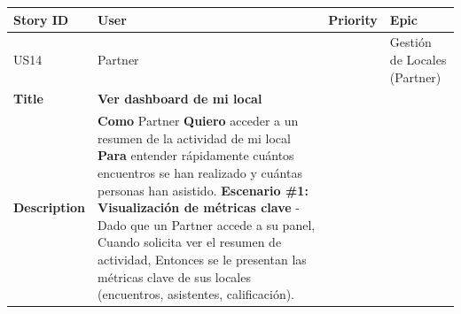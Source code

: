 {\def\LTcaptype{none} %
\begin{longtable}[]{@{}
  >{\raggedright\arraybackslash}p{}
  >{\raggedright\arraybackslash}p{}
  >{\raggedright\arraybackslash}p{}
  >{\raggedright\arraybackslash}p{}@{}}
\toprule\noalign{}
\begin{minipage}[b]{\linewidth}\raggedright
Story ID
\end{minipage} & \begin{minipage}[b]{\linewidth}\raggedright
User
\end{minipage} & \begin{minipage}[b]{\linewidth}\raggedright
Priority
\end{minipage} & \begin{minipage}[b]{\linewidth}\raggedright
Epic
\end{minipage} \\
\midrule\noalign{}
\endhead
\bottomrule\noalign{}
\endlastfoot
US14 & Partner & 5 & Gestión de Locales (Partner) \\
\textbf{Title} & \textbf{Ver dashboard de mi local} & & \\
\textbf{Description} & \textbf{Como} Partner \textbf{Quiero} acceder a
un resumen de la actividad de mi local \textbf{Para} entender
rápidamente cuántos encuentros se han realizado y cuántas personas han
asistido. \textbf{Escenario \#1: Visualización de métricas clave} - Dado
que un Partner accede a su panel, Cuando solicita ver el resumen de
actividad, Entonces se le presentan las métricas clave de sus locales
(encuentros, asistentes, calificación). & & \\
\end{longtable}
}

